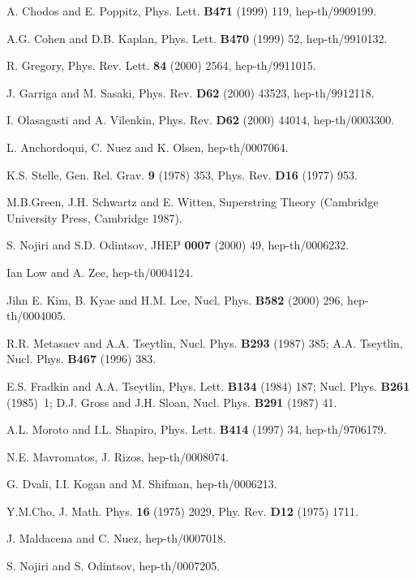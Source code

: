 \documentclass[a4paper,12pt]{article}
\begin{document}
\begin{thebibliography}{99}
 A. Chodos and E. Poppitz, Phys. Lett. {\bf B471} (1999) 119, 
hep-th/9909199.

 A.G. Cohen and D.B. Kaplan, Phys. Lett. {\bf B470} (1999) 52, 
hep-th/9910132.

 R. Gregory, Phys. Rev. Lett. {\bf 84} (2000) 2564, 
hep-th/9911015.

 J. Garriga and M. Sasaki, Phys. Rev. {\bf D62} (2000) 43523, 
hep-th/9912118.

 I. Olasagasti and A. Vilenkin, Phys. Rev. {\bf D62} 
(2000) 44014, hep-th/0003300.


 L. Anchordoqui, C. Nu\coordHE{}ez and K. Olsen, 
hep-th/0007064.  

 K.S. Stelle, Gen. Rel. Grav. {\bf 9} (1978) 353, Phys. Rev. 
{\bf D16} (1977) 953.

 M.B.Green, J.H. Schwartz and E. Witten, Superstring Theory 
(Cambridge University Press, Cambridge 1987).

 S. Nojiri and S.D. Odintsov, JHEP {\bf 0007} (2000) 49, 
hep-th/0006232.

 Ian Low and A. Zee, hep-th/0004124.

 Jihn E. Kim, B. Kyae and H.M. Lee, Nucl. Phys. {\bf B582} 
(2000) 296, hep-th/0004005.

 R.R. Metasaev and A.A. Tseytlin, Nucl. Phys. {\bf B293} 
(1987) 385; A.A. Tseytlin, Nucl. Phys. {\bf B467} (1996) 383.

 E.S. Fradkin and A.A. Tseytlin, Phys. Lett. {\bf B134} (1984) 
187; Nucl. Phys. {\bf B261} 
(1985)~1; D.J. Gross and J.H. Sloan, Nucl. Phys. {\bf B291} (1987) 41.

 A.L. Moroto and I.L. Shapiro, Phys. Lett. {\bf B414} (1997) 34, 
hep-th/9706179.

 N.E. Mavromatos, J. Rizos, hep-th/0008074. 

 G. Dvali, I.I. Kogan and M. Shifman, hep-th/0006213.

 Y.M.Cho, J. Math. Phys. {\bf 16} (1975) 2029, Phy. Rev. 
{\bf D12} (1975) 1711.

 J. Maldacena and C. Nu\coordHE{}ez, hep-th/0007018.

 S. Nojiri and S. Odintsov, hep-th/0007205.

\end{thebibliography}
\end{document}
